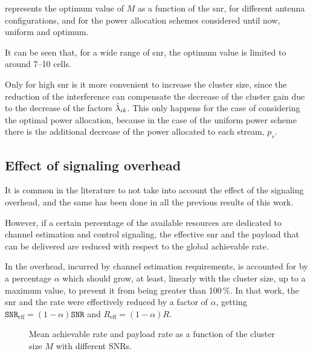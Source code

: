  represents the optimum value of $M$ as a function of the
\gls{snr}, for different antenna configurations, and for the power allocation
schemes considered until now, uniform and optimum.

It can be seen that, for a wide range of \gls{snr}, the optimum value is limited
to around 7--10 cells.

Only for high \gls{snr} is it more convenient to increase the cluster size,
since the reduction of the interference can compensate the decrease of the
cluster gain due to the decrease of the factors $\hat{\lambda}_{ik}$. This only
happens for the case of considering the optimal power allocation, because in the
case of the uniform power scheme there is the additional decrease of the power
allocated to each stream, $p_s$.

\subsection{Effect of signaling overhead}\label{ssec:achiev_signal_overhead}

It is common in the literature to not take into account the effect of the
signaling overhead, and the same has been done in all the previous results of
this work.

However, if a certain percentage of the available resources are dedicated to
channel estimation and control signaling, the effective \gls{snr} and the
payload that can be delivered are reduced with respect to the global achievable
rate.

In \cite{lozano13} the overhead, incurred by channel estimation requirements, is
accounted for by a percentage $\alpha$ which should grow, at least, linearly
with the cluster size, up to a maximum value, to prevent it from being greater
than 100\,\%. In that work, the \gls{snr} and the rate were effectively reduced
by a factor of $\alpha$, getting $\mathtt{SNR}_{\text{eff}}=\left(1-\alpha
\right)\mathtt{SNR}$ and $R_{\text{eff}} = \left(1-\alpha\right)R$.

\begin{figure}[t]
\begin{center}
    \hspace*{-1mm}
\end{center}
\caption{Mean achievable rate and payload rate as a function of the cluster size
$M$ with different SNRs.}
\label{fig:signal_overhead}
\end{figure}

